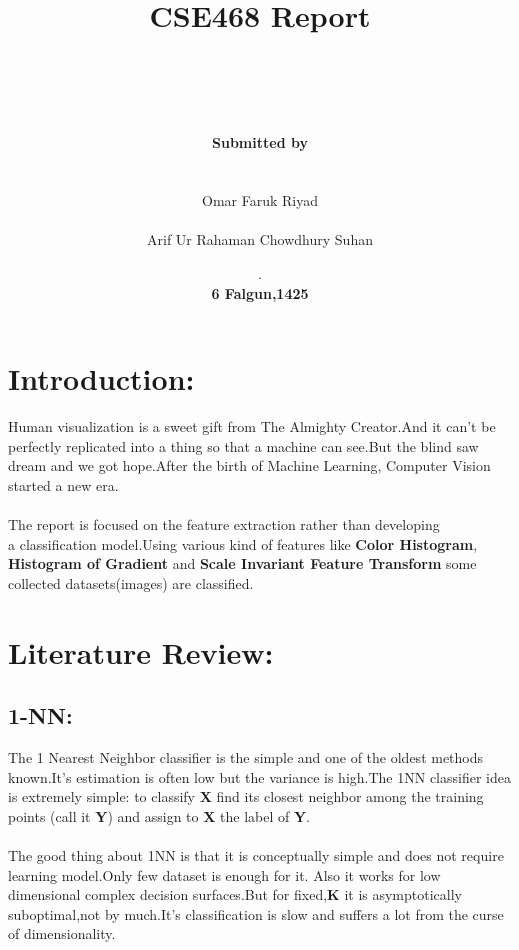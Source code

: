 \documentclass[12pt,a4paper] {article}
\author
	{	
		\\ \\ \\ \\ 
		\textbf{ {\LARGE Submitted by}} \\ \\ \\
		{\LARGE Omar Faruk Riyad } \\  \\
		{\LARGE Arif Ur Rahaman Chowdhury Suhan}
	}
\title
	{
		\textbf{ {\Huge	CSE468 Report} }
	}
\date{
		.\\
		\textbf{6 Falgun,1425}
	}
\begin{document}
	\maketitle
	\pagecolor{my_color}
	\pagebreak
	\pagecolor{white}

	\section{Introduction:}
	Human visualization is a sweet gift from The Almighty Creator.And it can't be perfectly replicated 
	into a thing so that a machine can see.But the blind saw dream and we got hope.After the birth of Machine Learning, 
	Computer Vision started a new era.
	\\ \\
	The report is focused on the feature extraction rather than developing \\ a classification model.Using 
	various kind of features like \textbf{Color Histogram}, \\ \textbf{Histogram of Gradient} and \textbf{Scale Invariant Feature Transform} 
	some collected datasets(images) are classified.
	
	
	\section{Literature Review:}

	\subsection{1-NN:}
	The 1 Nearest Neighbor classifier is the simple and one of the oldest methods known.It's 
	estimation is often low but the variance is high.The 1NN classifier idea is 
	extremely simple: to classify \textbf{X} find its closest neighbor among the training
	points (call it \textbf{Y}) and assign to \textbf{X} the label of \textbf{Y}. 
	\\ \\
	The good thing about 1NN is that it is conceptually simple and does not require learning model.Only 
	few dataset is enough for it. Also it works for low dimensional complex decision surfaces.But 
	for fixed,\textbf{K} it is asymptotically suboptimal,not by much.It's classification is slow and 
	suffers a lot from the curse of dimensionality.
\end{document}
